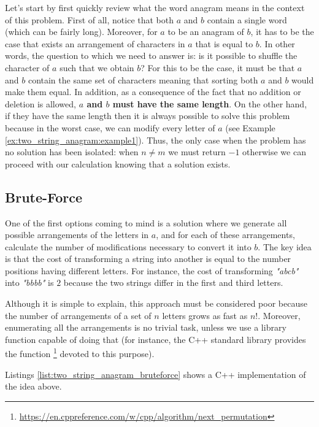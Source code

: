 Let's start by first quickly review what the word anagram means in the context of this problem. First of all, notice that both $a$ and $b$ contain a single word (which can be fairly long).
Moreover, for $a$ to be an anagram
of $b$, it has to be the case that exists an arrangement of characters in $a$ that is equal to $b$.
In other words, the question to which we need to answer is: is it possible to shuffle the character of $a$ such that we obtain $b$?
For this to be the case, it must be that $a$ and $b$ contain the same set of characters meaning that sorting both $a$ and $b$ would make them equal.
In addition, as a consequence of the fact that no addition or deletion
is allowed, \textbf{$a$ and $b$ must have the same length}. 
On the other hand, if they have the same length then it is always
possible to solve this problem because in the worst case, we can modify every letter of $a$ (see Example \ref{ex:two_string_anagram:example1}).
Thus, the only case when the problem has no solution has been isolated: when $n \neq m$ we must return $-1$ otherwise we can proceed with our calculation knowing that a solution exists.

\subsection{Brute-Force}
\label{sec:anagrams:bruteforce}
One of the first options coming to mind is a solution where we generate all possible arrangements of the letters in $a$, and for each of these arrangements, calculate the number of modifications necessary to convert it into $b$. 
The key idea is that the cost of transforming a string into another is equal to the number positions having different letters. 
For instance, the cost of transforming \textit{"abcb"} into \textit{"bbbb"} is $2$ because the two strings differ in the first and third letters. 

Although it is simple to explain, this approach must be considered poor because the number of arrangements of a set of $n$ letters grows as fast as $n!$.
Moreover, enumerating all the arrangements is no trivial task, unless we use a  library function capable of doing that (for instance, the C++ standard library provides the function \footnote{\href{https://en.cppreference.com/w/cpp/algorithm/next_permutation}{https://en.cppreference.com/w/cpp/algorithm/next\_permutation}} devoted to this purpose).


Listings \ref{list:two_string_anagram_bruteforce} shows a C++ implementation of the idea above.

